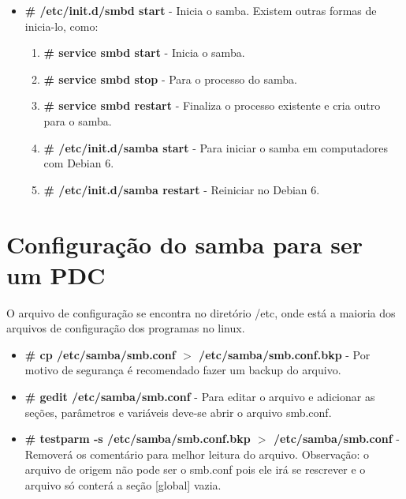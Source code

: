 \begin{itemize}
	\item \textbf{\# /etc/init.d/smbd start} - Inicia o samba. Existem outras formas de inicia-lo, como:
		\begin{enumerate}
			\item \textbf{\# service smbd start} - Inicia o samba.
			\item \textbf{\# service smbd stop} - Para o processo do samba.
			\item \textbf{\# service smbd restart} - Finaliza o processo existente e cria outro para o samba.
			\item \textbf{\# /etc/init.d/samba start} - Para iniciar o samba em computadores com Debian 6.
			\item \textbf{\# /etc/init.d/samba restart} - Reiniciar no Debian 6.
		\end{enumerate}
\end{itemize}

\section{Configuração do samba para ser um PDC}

O arquivo de configuração se encontra no diretório /etc, onde está a maioria dos arquivos de configuração dos programas no linux.

\begin{itemize}
	\item \textbf{\# cp /etc/samba/smb.conf $>$ /etc/samba/smb.conf.bkp} - Por motivo de segurança é recomendado fazer um backup do arquivo.
	\item \textbf{\# gedit /etc/samba/smb.conf} - Para editar o arquivo e adicionar as seções, parâmetros e variáveis deve-se abrir o arquivo smb.conf.
	\item \textbf{\# testparm -s /etc/samba/smb.conf.bkp $>$ /etc/samba/smb.conf} - Removerá os comentário para melhor leitura do arquivo. Observação: o arquivo de origem não pode ser o smb.conf pois ele irá se rescrever e o arquivo só conterá a seção [global] vazia.  
\end{itemize}

